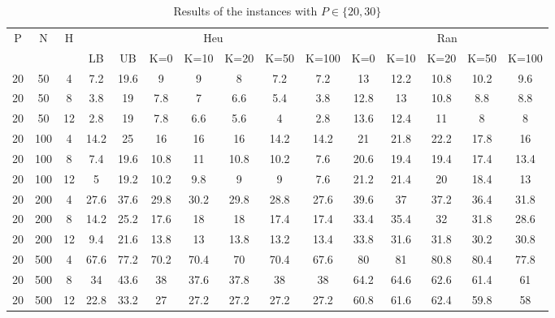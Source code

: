 \documentclass[review,3p,times,authoryear,12pt]{elsarticle}
\begin{document}
\begin{table}[htbp]
\footnotesize
  \centering
  \setlength{\belowcaptionskip}{10pt}
  \caption{Results of the instances with $P\in\{20, 30\}$}
  \begin{tabular}{ccccccccccccccc}
  \hline
  \multicolumn{1}{c}{\multirow{2}{*}{P}}
  & \multicolumn{1}{c}{\multirow{2}{*}{N}}
  & \multicolumn{1}{c}{\multirow{2}{*}{H}}
  & \multicolumn{7}{c}{Heu}
  & \multicolumn{5}{c}{Ran}\\
  \cline{4-15}
  \multicolumn{1}{c}{}
  &\multicolumn{1}{c}{}
  &\multicolumn{1}{c}{}
  &\multicolumn{1}{c}{LB}&{UB}&{K=0}&{K=10}&{K=20}&{K=50}&{K=100}
  &\multicolumn{1}{c}{K=0}&{K=10}&{K=20}&{K=50}&{K=100}\\
  \hline

    20    & 50    & 4     & 7.2   & 19.6  & 9     & 9     & 8     & 7.2   & 7.2   & 13    & 12.2  & 10.8  & 10.2  & 9.6 \\
    20    & 50    & 8     & 3.8   & 19    & 7.8   & 7     & 6.6   & 5.4   & 3.8   & 12.8  & 13    & 10.8  & 8.8   & 8.8 \\
    20    & 50    & 12    & 2.8   & 19    & 7.8   & 6.6   & 5.6   & 4     & 2.8   & 13.6  & 12.4  & 11    & 8     & 8 \\
    20    & 100   & 4     & 14.2  & 25    & 16    & 16    & 16    & 14.2  & 14.2  & 21    & 21.8  & 22.2  & 17.8  & 16 \\
    20    & 100   & 8     & 7.4   & 19.6  & 10.8  & 11    & 10.8  & 10.2  & 7.6   & 20.6  & 19.4  & 19.4  & 17.4  & 13.4 \\
    20    & 100   & 12    & 5     & 19.2  & 10.2  & 9.8   & 9     & 9     & 7.6   & 21.2  & 21.4  & 20    & 18.4  & 13 \\
    20    & 200   & 4     & 27.6  & 37.6  & 29.8  & 30.2  & 29.8  & 28.8  & 27.6  & 39.6  & 37    & 37.2  & 36.4  & 31.8 \\
    20    & 200   & 8     & 14.2  & 25.2  & 17.6  & 18    & 18    & 17.4  & 17.4  & 33.4  & 35.4  & 32    & 31.8  & 28.6 \\
    20    & 200   & 12    & 9.4   & 21.6  & 13.8  & 13    & 13.8  & 13.2  & 13.4  & 33.8  & 31.6  & 31.8  & 30.2  & 30.8 \\
    20    & 500   & 4     & 67.6  & 77.2  & 70.2  & 70.4  & 70    & 70.4  & 67.6  & 80    & 81    & 80.8  & 80.4  & 77.8 \\
    20    & 500   & 8     & 34    & 43.6  & 38    & 37.6  & 37.8  & 38    & 38    & 64.2  & 64.6  & 62.6  & 61.4  & 61 \\
    20    & 500   & 12    & 22.8  & 33.2  & 27    & 27.2  & 27.2  & 27.2  & 27.2  & 60.8  & 61.6  & 62.4  & 59.8  & 58 \\

\end{tabular}
\end{table}
\end{document}
